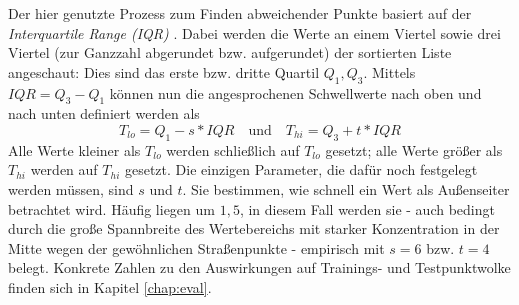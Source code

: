Der hier genutzte Prozess zum Finden abweichender Punkte basiert auf der \textit{Interquartile Range (IQR)} \citep{Rousseeuw.Hubert-2011}. Dabei werden die Werte an einem Viertel sowie drei Viertel (zur Ganzzahl abgerundet bzw. aufgerundet) der sortierten Liste angeschaut: Dies sind das erste bzw. dritte Quartil $Q_1, Q_3$. Mittels $IQR = Q_3 - Q_1$ können nun die angesprochenen Schwellwerte nach oben und nach unten definiert werden als
\begin{equation}
    T_{lo} = Q_1 - s * IQR  
        \quad\text{und}\quad 
    T_{hi} = Q_3 + t * IQR
\end{equation}
Alle Werte kleiner als $T_{lo}$ werden schließlich auf $T_{lo}$ gesetzt; alle Werte größer als $T_{hi}$ werden auf $T_{hi}$ gesetzt. Die einzigen Parameter, die dafür noch festgelegt werden müssen, sind $s$ und $t$. Sie bestimmen, wie schnell ein Wert als Außenseiter betrachtet wird. Häufig liegen um $1,5$, in diesem Fall werden sie - auch bedingt durch die große Spannbreite des Wertebereichs mit starker Konzentration in der Mitte wegen der gewöhnlichen Straßenpunkte - empirisch mit $s=6$ bzw. $t=4$ belegt. Konkrete Zahlen zu den Auswirkungen auf Trainings- und Testpunktwolke finden sich in Kapitel \ref{chap:eval}.